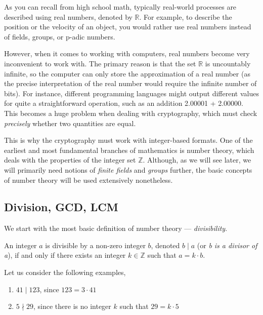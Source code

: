 \documentclass[../lecture-notes-148x210.tex]{subfiles}
\begin{document}
As you can recall from high school math, typically real-world processes are
described using real numbers, denoted by $\mathbb{R}$. For example, to describe
the position or the velocity of an object, you would rather use real numbers
instead of fields, groups, or p-adic numbers.

However, when it comes to working with computers, real numbers become very
inconvenient to work with. The primary reason is that the set $\mathbb{R}$ is
uncountably infinite, so the computer can only store the approximation of a real
number (as the precise interpretation of the real number would require the
infinite number of bits). For instance, different programming languages might
output different values for quite a straightforward operation, such as an
addition \textsf{2.00001 + 2.00000}. This becomes a huge problem when dealing
with cryptography, which must check \textit{precisely} whether two quantities
are equal.

This is why the cryptography must work with integer-based formats. One of the
earliest and most fundamental branches of mathematics is number theory, which
deals with the properties of the integer set $\mathbb{Z}$. Although, as we will
see later, we will primarily need notions of \emph{finite fields} and
\emph{groups} further, the basic concepts of number theory will be used
extensively nonetheless.

\subsection{Division, GCD, LCM}

We start with the most basic definition of number theory --- \emph{divisibility}.

\begin{definition}
    \label{def:divisibility}
    An integer $a$ is divisible by a non-zero integer $b$, denoted $b \mid a$ (or \emph{b is a divisor of a}), if and only if there exists an integer $k \in \mathbb{Z}$ such that $a = k \cdot b$.
\end{definition}

\begin{example} 
    \label{example:divisibility_1}
    Let us consider the following examples,
    \begin{enumerate}
        \item $41 \mid 123$, since $123 = 3 \cdot 41$
        \item $5 \nmid 29$, since there is no integer $k$ such that $29 = k \cdot 5$
    \end{enumerate}
\end{example}
\end{document}
